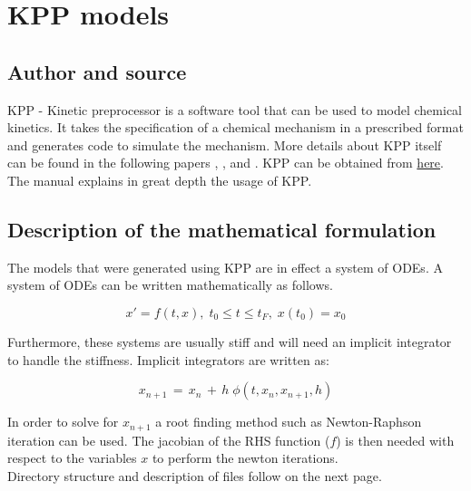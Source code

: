 \section{KPP models}
\subsection{Author and source}
KPP - Kinetic preprocessor is a software tool that can be used to model chemical kinetics. It takes the specification of a chemical mechanism in a prescribed format and generates code to simulate the mechanism. More details about KPP itself can be found in the following papers \cite{Damian_2002}, \cite{Sandu_2003}, \cite{Daescu_2003} and \cite{Sandu_2006}. KPP can be obtained from \href{http://people.cs.vt.edu/~asandu/Software/Kpp/}{here}. The manual \cite{Sandu_2005} explains in great depth the usage of KPP.
\subsection{Description of the mathematical formulation}
The models that were generated using KPP are in effect a system of ODEs. A system of ODEs can be written mathematically as follows.

\[x' = f(t, x), \; t_0 \leq t \leq t_F, \; x(t_0) = x_0\]


\noindent Furthermore, these systems are usually stiff and will need an implicit integrator to handle the stiffness. Implicit integrators are written as:

\[x_{n+1} \,=\,  x_n \,+\, h \; \phi(t, x_n, x_{n+1}, h)\]

\noindent In order to solve for $x_{n+1}$ a root finding method such as Newton-Raphson iteration can be used. The jacobian of the RHS function ($f$) is then needed with respect to the variables $x$ to perform the newton iterations. \\

\noindent Directory structure and description of files follow on the next page.
\clearpage
